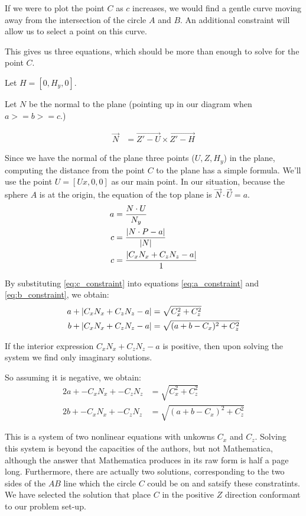 \documentclass{article}
\begin{document}
If we were to plot the point $C$ as $c$ increases, we
would find a gentle curve moving away from the intersection
of the circle $A$ and $B$. An additional constraint will
allow us to select a point on this curve.

This gives us three equations, which
should be more than enough to solve for the point $C$.

Let $H = [0, H_y,0]$.

Let $N$ be the normal to the plane (pointing up in our diagram
when $ a >= b >= c $.)

\begin{align}
\overrightarrow{N} &= \overrightarrow{Z' - U}  \times \overrightarrow{Z' - H}
\end{align}

Since we have the normal of the plane three points ($U,Z,H_y$) in the plane,
computing the distance from the point $C$ to the plane has a simple
formula.
We'll use the point $U = [Ux, 0, 0]$ as our main point.
In our situation, because the sphere $A$ is at the origin,
the equation of the top plane  is
$ \overrightarrow{N} \cdot \overrightarrow{U} = a$.
\begin{align}
a &= \frac{N \cdot U}{N_y} \\
c &= \frac{\left\lvert N \cdot P - a\right\rvert}{\left\lvert N\right\rvert} \\
c &= \frac{\left\lvert C_x  N_x  + C_z  N_z - a\right\rvert}{1} \label{eq:c_constraint}
\end{align}

By substituting \ref{eq:c_constraint} into equations
\ref{eq:a_constraint} and \ref{eq:b_constraint},
we obtain:
\begin{align}
  a + \left\lvert C_x N_x + C_z N_z - a\right\rvert &= \sqrt{C_x^2 + C_z^2} \\
  b + \left\lvert C_x N_x + C_z N_z - a\right\rvert &= \sqrt{(a+b-C_x)^2 + C_z^2}
\end{align}

If the interior expression $C_x N_x + C_z N_z - a$ is positive,
then upon solving the system we find only imaginary solutions.

So assuming it is negative, we obtain:
\begin{align}
  2a + -C_x N_x + -C_z N_z  &= \sqrt{C_x^2 + C_z ^2} \\
  2b + -C_x N_x + -C_z N_z  &= \sqrt{(a+b-C_x)^2 + C_z^2}
\end{align}



This is a system of two nonlinear equations with unkowns $C_x$ and $C_z$.
Solving this system is beyond the capacities of the authors,
but not Mathematica, although the answer that Mathematica produces
in its raw form is half a page long.
Furthermore, there are actually two solutions, corresponding
to the two sides of the $AB$ line which the circle $C$ could be
on and satsify these constratints.
We have selected the solution that place $C$ in the positive $Z$
direction conformant to our problem set-up.
\end{document}
